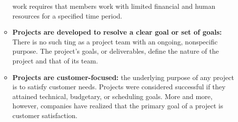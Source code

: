 \begin{itemize}
\begin{itemize}
				work requires that members work with limited financial and human resources for
				a specified time period.
				\item {\bf Projects are developed to resolve a clear goal or set of goals:} 
				There is no such ting as a project team with an ongoing, nonspecific purpose. 
				The project's goals, or deliverables, define the nature of the project and that
				of its team. 
				\item {\bf Projects are customer-focused:} the underlying purpose of any project
				is to satisfy customer needs. Projects were considered successful if they 
				attained technical, budgetary, or scheduling goals. More and more, however, 
				companies have realized that the primary goal of a project is customer 
				satisfaction.
			\end{itemize}
	\end{itemize}

\clearpage
